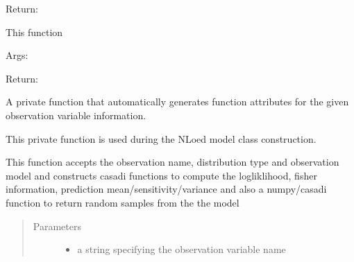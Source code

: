 \documentclass[letterpaper,10pt,english,openany,oneside]{sphinxmanual}
\begin{document}
\begin{fulllineitems}
\begin{fulllineitems}
\begin{quote}
\begin{description}
\begin{itemize}
\end{itemize}

\end{description}\end{quote}

Return:

\end{fulllineitems}


\begin{fulllineitems}
\label{\detokenize{nloed:nloed.model.Model.evaluate}}
This function

Args:

Return:

\end{fulllineitems}


\begin{fulllineitems}
\label{\detokenize{nloed:nloed.model.Model._get_distribution_functions}}
A private function that automatically generates function attributes for the given
observation variable information.

This private function is used during the NLoed model class construction.

This function accepts the observation name, distribution type
and observation model and constructs casadi functions to compute
the logliklihood, fisher information, prediction mean/sensitivity/variance
and also a numpy/casadi function to return random samples from the the model
\begin{quote}\begin{description}
\item[{Parameters}] \leavevmode\begin{itemize}
\item {} 
 \textendash{} a string specifying the observation variable name


\end{itemize}
\end{description}
\end{quote}
\end{fulllineitems}
\end{fulllineitems}
\end{document}
